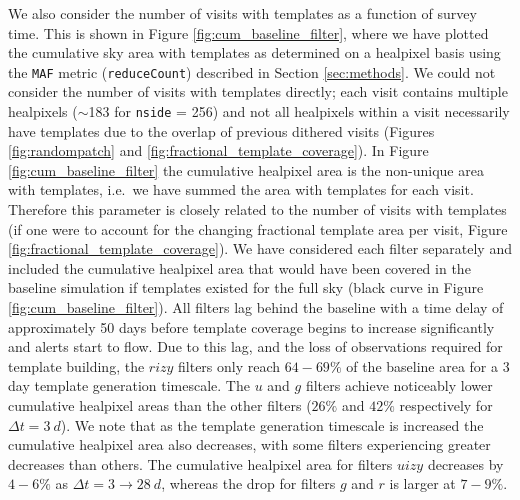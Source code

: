 \documentclass[preprintm,linenumbers]{aastex631}
\newcommand{\maf}{\texttt{MAF}\xspace}
\begin{document}
  We also consider the number of visits with templates as a function of survey time.
		This is shown in Figure \ref{fig:cum_baseline_filter}, where we have plotted the cumulative sky area with templates as determined on a healpixel basis using the \maf metric (\verb|reduceCount|) described in Section \ref{sec:methods}.
		We could not consider the number of visits with templates directly; each visit contains multiple healpixels ($\sim$183 for \texttt{nside} = 256) and not all healpixels within a visit necessarily have templates due to the overlap of previous dithered visits (Figures \ref{fig:randompatch} and \ref{fig:fractional_template_coverage}). %
		In Figure \ref{fig:cum_baseline_filter} the cumulative healpixel area is the non-unique area with templates, i.e.\ we have summed the area with templates for each visit. 		
		Therefore this parameter is closely related to the number of visits with templates (if one were to account for the changing fractional template area per visit, Figure \ref{fig:fractional_template_coverage}).
		We have considered each filter separately and included the cumulative healpixel area that would have been covered in the baseline simulation if templates existed for the full sky (black curve in Figure \ref{fig:cum_baseline_filter}).
		All filters lag behind the baseline with a time delay of approximately 50 days before template coverage begins to increase significantly and alerts start to flow.
  Due to this lag, and the loss of observations required for template building, the $rizy$ filters only reach $64-69\%$ of the baseline area for a 3 day template generation timescale.
		The $u$ and $g$ filters achieve noticeably lower cumulative healpixel areas than the other filters ($26\%$ and $42\%$ respectively for $\Delta t = 3\ \si{d}$).
		We note that as the template generation timescale is increased the cumulative healpixel area also decreases, with some filters experiencing greater decreases than others.
		The cumulative healpixel area for filters $uizy$ decreases by $4-6\%$ as $\Delta t = 3 \rightarrow 28\ \si{d}$, whereas the drop for filters $g$ and $r$ is larger at $7 - 9 \%$. %
\end{document}
